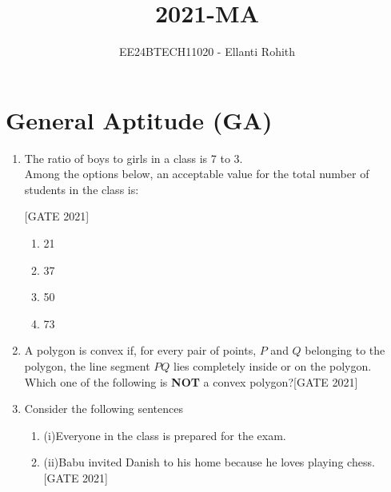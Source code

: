 \documentclass[journal,12pt,onecolumn]{IEEEtran}
\theoremstyle{remark}
\begin{document}

\vspace{3cm}

\title{2021-MA}
\author{EE24BTECH11020 -  Ellanti Rohith}
\maketitle

\renewcommand{\thefigure}{\theenumi}
\renewcommand{\thetable}{\theenumi}
\section*{General Aptitude (GA)}




\begin{enumerate}
    \item The ratio of boys to girls in a class is 7 to 3.\\
    Among the options below, an acceptable value for the total number of students in the class is:

    \hfill{[GATE 2021]}\begin{multicols}{4}
    \begin{enumerate}
        \item 21
        \item 37
        \item 50
        \item 73
    \end{enumerate}
    \end{multicols}

    \item A polygon is convex if, for every pair of points, $ P $ and $ Q $ belonging to the polygon, the line segment $ PQ $ lies completely inside or on the polygon.\\
    Which one of the following is \textbf{NOT} a convex polygon?\hfill{[GATE 2021]}

    \item Consider the following sentences \\
\begin{enumerate}[label={}]
\item (i)Everyone in  the class is prepared for the exam.
\item (ii)Babu invited Danish to his home because he loves playing chess.
\hfill{[GATE 2021]}\\
\end{enumerate}


\end{enumerate}
\end{document}
